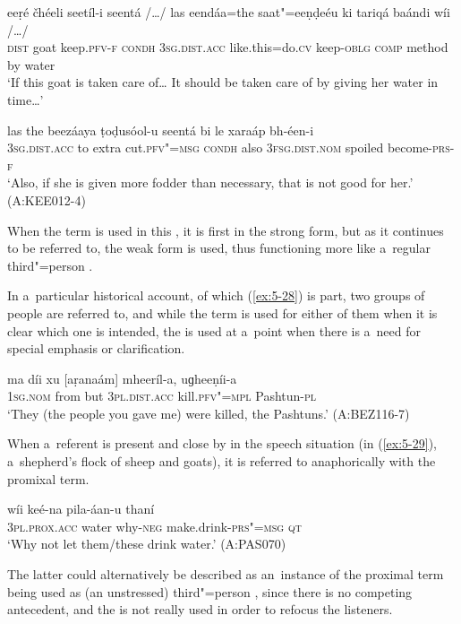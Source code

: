 \begin{exe}
\ex
\label{ex:5-27}
\gll eeṛé čhéeli seetíl-i seentá /{\ldots}/ las eendáa=the saat"=eeṇḍeéu ki
tariqá baándi wíi /{\ldots}/ \\
\textsc{dist} goat keep.\textsc{pfv-f} \textsc{condh} {} \textsc{3sg.dist.acc} like.this=do.\textsc{cv} keep-\textsc{oblg} \textsc{comp} method by water\\
\glt `If this goat is taken care of{\ldots} It should be taken care of by giving her water in time{\ldots}'

\gll las the beezáaya ṭoḍusóol-u seentá bi le xaraáp bh-éen-i \\
\textsc{3sg}.\textsc{dist.acc} to extra cut.\textsc{pfv"=msg} \textsc{condh} also
\textsc{3fsg}.\textsc{dist.nom} spoiled become-\textsc{prs-f} \\
\glt `Also, if she is given more fodder than necessary, that is not good for her.' (A:KEE012-4)
\end{exe}
When the term is used in this , it is first in the strong form, but as it continues to be referred to, the weak form is used, thus functioning more like a~regular third"=person .

In a~particular historical account, of which (\ref{ex:5-28}) is part, two groups of people are referred to, and while the  term is used for either of them when it is clear which one is intended, the  is used at a~point when there is a~need for special emphasis or clarification.

\begin{exe}
\ex
\label{ex:5-28}
\gll ma díi xu [aṛanaám] mheeríl-a, uɡheeṇíi-a\\
\textsc{1sg}.\textsc{nom} from but \textsc{3pl.}\textsc{dist.acc} kill.\textsc{pfv"=mpl} Pashtun-\textsc{pl}\\
\glt `They (the people you gave me) were killed, the Pashtuns.' (A:BEZ116-7)\\
\end{exe}
When a~referent is present and close by in the speech situation (in (\ref{ex:5-29}), a~shepherd's flock of sheep and goats), it is referred to anaphorically with the promixal term.

\begin{exe}
\ex
\label{ex:5-29}
\gll [aniaám] wíi keé-na pila-áan-u thaní \\
\textsc{3pl.prox.acc} water why-\textsc{neg} make.drink-\textsc{prs"=msg} \textsc{qt}\\
\glt `Why not let them/these drink water.' (A:PAS070)
\end{exe}
The latter could alternatively be described as an~instance of the proximal term being used as (an unstressed) third"=person , since there is no competing antecedent, and the  is not really used in order to refocus the listeners.

